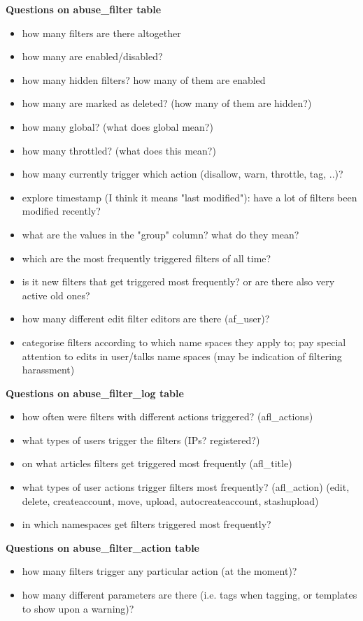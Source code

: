 \documentclass{sigchi}
\begin{document}
\textbf{Questions on abuse\_filter table}
\begin{itemize}
    \item how many filters are there altogether
    \item how many are enabled/disabled?
    \item how many hidden filters? how many of them are enabled
    \item how many are marked as deleted? (how many of them are hidden?)
    \item how many global? (what does global mean?)
    \item how many throttled? (what does this mean?)
    \item how many currently trigger which action (disallow, warn, throttle, tag, ..)?
    \item explore timestamp (I think it means "last modified"): have a lot of filters been modified recently?
    \item what are the values in the "group" column? what do they mean?
    \item which are the most frequently triggered filters of all time?
    \item is it new filters that get triggered most frequently? or are there also very active old ones?
    \item how many different edit filter editors are there (af\_user)?
    \item categorise filters according to which name spaces they apply to; pay special attention to edits in user/talks name spaces (may be indication of filtering harassment)
\end{itemize}

\textbf{Questions on abuse\_filter\_log table}
\begin{itemize}
    \item how often were filters with different actions triggered? (afl\_actions)
    \item what types of users trigger the filters (IPs? registered?)
    \item on what articles filters get triggered most frequently (afl\_title)
    \item what types of user actions trigger filters most frequently? (afl\_action) (edit, delete, createaccount, move, upload, autocreateaccount, stashupload)
    \item in which namespaces get filters triggered most frequently?
\end{itemize}

\textbf{Questions on abuse\_filter\_action table}
\begin{itemize}
    \item how many filters trigger any particular action (at the moment)?
    \item how many different parameters are there (i.e. tags when tagging, or templates to show upon a warning)?
\end{itemize}
\end{document}
